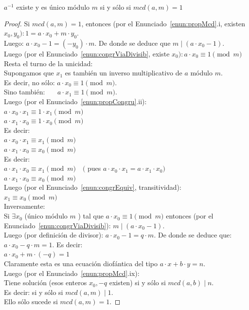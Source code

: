 \begin{enunciado} \label{enun:existInvModular}\leavevmode\par
$a^{-1}$ existe y es único módulo $m$ si y sólo si $mcd(a, m)=1$
\end{enunciado}

\begin{proof}
Si $mcd(a, m)=1$, entonces (por el Enunciado~\ref{enun:propMcd}.i, existen $x_{0}, y_{0}): 1=a \cdot x_{0}+m \cdot y_{0}$. \\
Luego: $a \cdot x_{0}-1=(-y_{0}) \cdot m$. De donde se deduce que $m \mid (a \cdot x_{0}-1)$. \\
Luego (por el Enunciado~\ref{enun:congrViaDivisib}, existe $x_{0}): a \cdot x_{0} \equiv 1\pmod m$ \\
Resta el turno de la unicidad: \\
Supongamos que $x_{1}$ es también un inverso multiplicativo de $a$ módulo $m$. \\
Es decir, no sólo: $a \cdot x_{0} \equiv 1\pmod m$. \\
Sino también: \, $\quad a \cdot x_{1} \equiv 1\pmod m$. \\
Luego (por el Enunciado~\ref{enun:propCongru}.ii): \\
$a \cdot x_{0} \cdot x_{1} \equiv 1 \cdot x_{1}\pmod m$ \\
$a \cdot x_{1} \cdot x_{0} \equiv 1 \cdot x_{0}\pmod m$ \\
Es decir: \\
$a \cdot x_{0} \cdot x_{1} \equiv x_{1}\pmod m$ \\
$a \cdot x_{1} \cdot x_{0} \equiv x_{0}\pmod m$ \\
Es decir: \\
$a \cdot x_{1} \cdot x_{0} \equiv x_{1}\pmod m \quad($ pues $a \cdot x_{0} \cdot x_{1}=a \cdot x_{1} \cdot x_{0})$ \\
$a \cdot x_{1} \cdot x_{0} \equiv x_{0}\pmod m$ \\
Luego (por el Enunciado~\ref{enun:congrEquiv}, transitividad): \\
$x_{1} \equiv x_{0}\pmod m$ \\
Inversamente: \\
Si $\exists x_{0}$ (único módulo $m$ ) tal que $a \cdot x_{0} \equiv 1\pmod m$ entonces (por el Enunciado~\ref{enun:congrViaDivisib}): $m \mid(a \cdot x_{0}-1)$. \\
Luego (por definición de divisor): $a \cdot x_0 - 1=q \cdot m$. De donde se deduce que: \\
$a \cdot x_{0}-q \cdot m=1$. Es decir: \\
$a \cdot x_{0}+m \cdot(-q)=1$ \\
Claramente esta es una ecuación diofántica del tipo $a \cdot x+b \cdot y=n$. \\
Luego (por el Enunciado~\ref{enun:propMcd}.ix): \\
Tiene solución (esos enteros $x_{0},-q$ existen) si y sólo si $mcd(a,b) \mid n$. \\
Es decir: si y sólo si $mcd(a,m) \mid 1$. \\
Ello sólo sucede si $mcd(a,m)=1$.
\end{proof}

